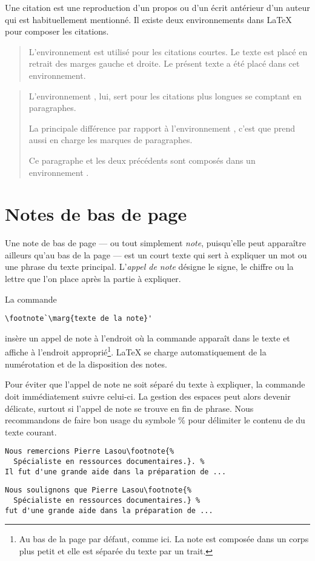 Une citation est une reproduction d'un propos ou d'un écrit antérieur
d'un auteur qui est habituellement mentionné. Il existe deux
environnements dans {\LaTeX} pour composer les citations.

\begin{quote}
  L'environnement  est utilisé pour les citations courtes.
  Le texte est placé en retrait des marges gauche et droite. Le
  présent texte a été placé dans cet environnement.
\end{quote}

\begin{quotation}
  L'environnement , lui, sert pour les citations plus
  longues se comptant en paragraphes.

  La principale différence par rapport à l'environnement ,
  c'est que  prend aussi en charge les marques de
  paragraphes.

  Ce paragraphe et les deux précédents sont composés dans
  un environnement .
\end{quotation}


\section{Notes de bas de page}
\label{sec:apparence:notes}

Une note de bas de page --- ou tout simplement \emph{note},
puisqu'elle peut apparaître ailleurs qu'au bas de la page --- est un
court texte qui sert à expliquer un mot ou une phrase du texte
principal. L'\emph{appel de note} désigne le signe, le chiffre ou la
lettre que l'on place après la partie à expliquer.

La commande
\begin{lstlisting}
\footnote`\marg{texte de la note}'
\end{lstlisting}
insère un appel de note à l'endroit où la commande apparaît dans le
texte et affiche  à l'endroit
approprié\footnote{%
  Au bas de la page par défaut, comme ici. La note est composée dans
  un corps plus petit et elle est séparée du texte par un trait.}. %
{\LaTeX} se charge automatiquement de la numérotation et de la
disposition des notes.

Pour éviter que l'appel de note ne soit séparé du texte à expliquer,
la commande \cmd{\footnote} doit immédiatement suivre celui-ci. La
gestion des espaces peut alors devenir délicate, surtout si l'appel de
note se trouve en fin de phrase. Nous recommandons de faire bon usage
du symbole \% pour délimiter le contenu de \cmdprint{\footnote} du
texte courant.
\begin{lstlisting}[emph=footnote]
%% note en fin de phrase
Nous remercions Pierre Lasou\footnote{%
  Spécialiste en ressources documentaires.}. %
Il fut d'une grande aide dans la préparation de ...
\end{lstlisting}
\begin{lstlisting}[emph=footnote]
%% note au fil de la phrase
Nous soulignons que Pierre Lasou\footnote{%
  Spécialiste en ressources documentaires.} %
fut d'une grande aide dans la préparation de ...
\end{lstlisting}

